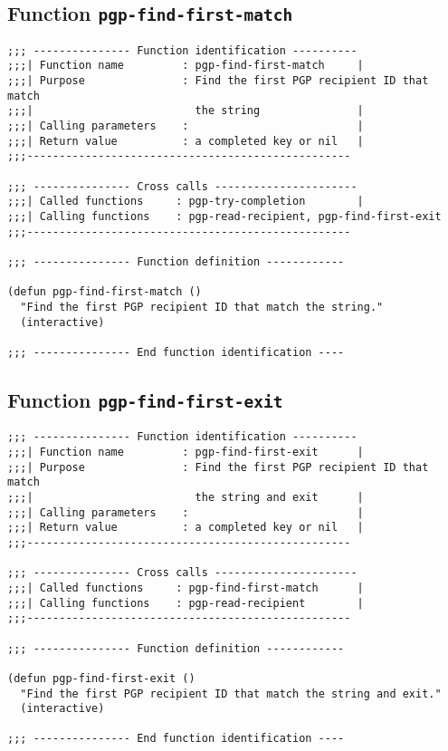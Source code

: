 \subsection{Function {\tt pgp-find-first-match}}
\leavevmode
\begin{verbatim}
;;; --------------- Function identification ----------
;;;| Function name         : pgp-find-first-match     |
;;;| Purpose               : Find the first PGP recipient ID that match
;;;|                         the string               |
;;;| Calling parameters    :                          |
;;;| Return value          : a completed key or nil   |
;;;--------------------------------------------------

;;; --------------- Cross calls ----------------------
;;;| Called functions     : pgp-try-completion        |
;;;| Calling functions    : pgp-read-recipient, pgp-find-first-exit
;;;--------------------------------------------------

;;; --------------- Function definition ------------

(defun pgp-find-first-match ()
  "Find the first PGP recipient ID that match the string."
  (interactive)

;;; --------------- End function identification ----
\end{verbatim}
\subsection{Function {\tt pgp-find-first-exit}}
\leavevmode
\begin{verbatim}
;;; --------------- Function identification ----------
;;;| Function name         : pgp-find-first-exit      |
;;;| Purpose               : Find the first PGP recipient ID that match
;;;|                         the string and exit      |
;;;| Calling parameters    :                          |
;;;| Return value          : a completed key or nil   |
;;;--------------------------------------------------

;;; --------------- Cross calls ----------------------
;;;| Called functions     : pgp-find-first-match      |
;;;| Calling functions    : pgp-read-recipient        |
;;;--------------------------------------------------

;;; --------------- Function definition ------------

(defun pgp-find-first-exit ()
  "Find the first PGP recipient ID that match the string and exit."
  (interactive)

;;; --------------- End function identification ----
\end{verbatim}
